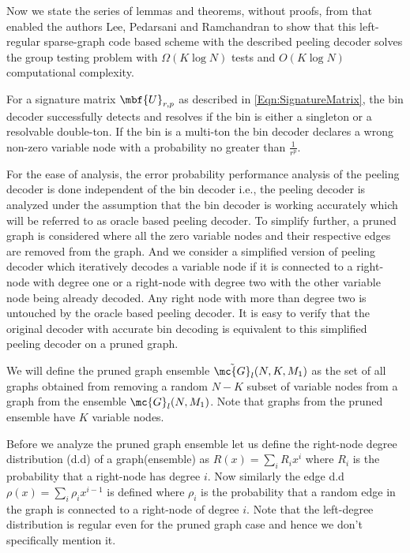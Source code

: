 \documentclass[conference,twocolumn]{IEEEtran}
\begin{document}
Now we state the series of lemmas and theorems, without proofs, from \cite{lee2015saffron} that enabled the authors Lee, Pedarsani and Ramchandran to show that this left-regular sparse-graph code based scheme with the described peeling decoder solves the group testing problem with $\Omega( K\log N)$ tests and $O(K\log N)$ computational complexity.

\begin{lemma}
\label{Lem:BinDecoderAnalysis}
For a signature matrix $\mbf{U}_{r,p}$ as described in \eqref{Eqn:SignatureMatrix}, the bin decoder successfully detects and resolves if the bin is either a singleton or a resolvable double-ton. If the bin is a multi-ton the bin decoder declares a wrong non-zero variable node with a probability no greater than $\frac{1}{r^p}$.
\end{lemma}

For the ease of analysis, the error probability performance analysis of the peeling decoder is done independent of the bin decoder i.e., the peeling decoder is analyzed under the assumption that the bin decoder is working accurately which will be referred to as oracle based peeling decoder. To simplify further, a pruned graph is considered where all the zero variable nodes and their respective edges are removed from the graph. And we consider a simplified version of peeling decoder which iteratively decodes a variable node if it is connected to a right-node with degree one or a right-node with degree two with the other variable node being already decoded. Any right node with more than degree two is untouched by the oracle based peeling decoder. It is easy to verify that the original decoder with accurate bin decoding is equivalent to this simplified peeling decoder on a pruned graph.

\begin{definition}
We will define the pruned graph ensemble $\tilde{\mc{G}}_l(N,K,M_1)$ as the set of all graphs obtained from removing a random $N-K$ subset of variable nodes from a graph from the ensemble $\mc{G}_l(N,M_1)$. Note that graphs from the pruned ensemble have $K$ variable nodes. 
\end{definition}

Before we analyze the pruned graph ensemble let us define the right-node degree distribution (d.d) of a graph(ensemble) as $R(x)=\sum_{i}R_i x^i$ where $R_i$ is the probability that a right-node has degree $i$. Now similarly the edge d.d $\rho(x)=\sum_{i}\rho_ix^{i-1}$ is defined where $\rho_i$ is the probability that a random edge in the graph is connected to a right-node of degree $i$. Note that the left-degree distribution is regular even for the pruned graph case and hence we don't specifically mention it.
\end{document}
